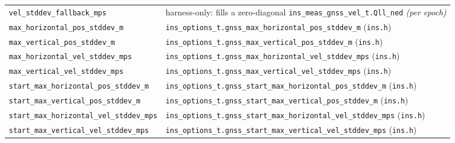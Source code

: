 \documentclass[11pt,a4paper]{article}
\newcommand{\code}[1]{\texttt{#1}}
\begin{document}
\begin{landscape}
\begin{center}
\begin{longtable}{@{}p{6.5cm}p{16.5cm}@{}}
\code{vel\_\allowbreak{}stddev\_\allowbreak{}fallback\_\allowbreak{}mps} & harness-only: fills a zero-diagonal \code{ins\_\allowbreak{}meas\_\allowbreak{}gnss\_\allowbreak{}vel\_\allowbreak{}t.Qll\_\allowbreak{}ned} \emph{(per epoch)} \\
\code{max\_\allowbreak{}horizontal\_\allowbreak{}pos\_\allowbreak{}stddev\_\allowbreak{}m} & \code{ins\_\allowbreak{}options\_\allowbreak{}t.gnss\_\allowbreak{}max\_\allowbreak{}horizontal\_\allowbreak{}pos\_\allowbreak{}stddev\_\allowbreak{}m} (\code{ins.h}) \\
\code{max\_\allowbreak{}vertical\_\allowbreak{}pos\_\allowbreak{}stddev\_\allowbreak{}m} & \code{ins\_\allowbreak{}options\_\allowbreak{}t.gnss\_\allowbreak{}max\_\allowbreak{}vertical\_\allowbreak{}pos\_\allowbreak{}stddev\_\allowbreak{}m} (\code{ins.h}) \\
\code{max\_\allowbreak{}horizontal\_\allowbreak{}vel\_\allowbreak{}stddev\_\allowbreak{}mps} & \code{ins\_\allowbreak{}options\_\allowbreak{}t.gnss\_\allowbreak{}max\_\allowbreak{}horizontal\_\allowbreak{}vel\_\allowbreak{}stddev\_\allowbreak{}mps} (\code{ins.h}) \\
\code{max\_\allowbreak{}vertical\_\allowbreak{}vel\_\allowbreak{}stddev\_\allowbreak{}mps} & \code{ins\_\allowbreak{}options\_\allowbreak{}t.gnss\_\allowbreak{}max\_\allowbreak{}vertical\_\allowbreak{}vel\_\allowbreak{}stddev\_\allowbreak{}mps} (\code{ins.h}) \\
\code{start\_\allowbreak{}max\_\allowbreak{}horizontal\_\allowbreak{}pos\_\allowbreak{}stddev\_\allowbreak{}m} & \code{ins\_\allowbreak{}options\_\allowbreak{}t.gnss\_\allowbreak{}start\_\allowbreak{}max\_\allowbreak{}horizontal\_\allowbreak{}pos\_\allowbreak{}stddev\_\allowbreak{}m} (\code{ins.h}) \\
\code{start\_\allowbreak{}max\_\allowbreak{}vertical\_\allowbreak{}pos\_\allowbreak{}stddev\_\allowbreak{}m} & \code{ins\_\allowbreak{}options\_\allowbreak{}t.gnss\_\allowbreak{}start\_\allowbreak{}max\_\allowbreak{}vertical\_\allowbreak{}pos\_\allowbreak{}stddev\_\allowbreak{}m} (\code{ins.h}) \\
\code{start\_\allowbreak{}max\_\allowbreak{}horizontal\_\allowbreak{}vel\_\allowbreak{}stddev\_\allowbreak{}mps} & \code{ins\_\allowbreak{}options\_\allowbreak{}t.gnss\_\allowbreak{}start\_\allowbreak{}max\_\allowbreak{}horizontal\_\allowbreak{}vel\_\allowbreak{}stddev\_\allowbreak{}mps} (\code{ins.h}) \\
\code{start\_\allowbreak{}max\_\allowbreak{}vertical\_\allowbreak{}vel\_\allowbreak{}stddev\_\allowbreak{}mps} & \code{ins\_\allowbreak{}options\_\allowbreak{}t.gnss\_\allowbreak{}start\_\allowbreak{}max\_\allowbreak{}vertical\_\allowbreak{}vel\_\allowbreak{}stddev\_\allowbreak{}mps} (\code{ins.h}) \\

\end{longtable}
\end{center}
\end{landscape}
\end{document}
